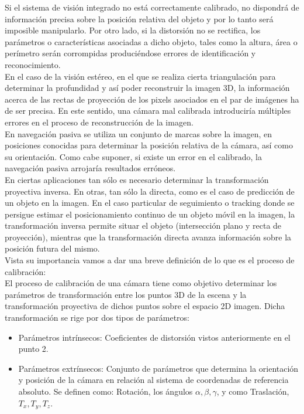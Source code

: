 \documentclass[a4,10pt]{article}
\begin{document}
\begin{enumerate}
Si el sistema de visión integrado no está correctamente calibrado, no dispondrá de información precisa sobre la posición relativa del objeto y por lo tanto será imposible manipularlo. Por otro lado, si la distorsión no se rectifica, los parámetros o características asociadas a dicho objeto, tales como la altura, área o perímetro serán corrompidas produciéndose errores de identificación y reconocimiento.\\
En el caso de la visión estéreo, en el que se realiza cierta triangulación para determinar la profundidad y así poder reconstruir la imagen 3D, la información acerca de las rectas de proyección de los pixels asociados en el par de imágenes ha de ser precisa. En este sentido, una cámara mal calibrada introduciría múltiples errores en el proceso de reconstrucción de la imagen.\\
En navegación pasiva se utiliza un conjunto de marcas sobre la imagen, en posiciones conocidas para determinar la posición relativa de la cámara, así como su orientación. Como cabe suponer, si existe un error en el calibrado, la navegación pasiva arrojaría resultados erróneos.\\
En ciertas aplicaciones tan sólo es necesario determinar la transformación proyectiva inversa. En otras, tan sólo la directa, como es el caso de predicción de un objeto en la imagen. En el caso particular de seguimiento o tracking donde se persigue estimar el posicionamiento continuo de un objeto móvil en la imagen, la transformación inversa permite situar el objeto (intersección plano y recta de proyección), mientras que la transformación directa avanza información sobre la posición futura del mismo.\\
Vista su importancia vamos a dar una breve definición de lo que es el proceso de calibración:\\
El proceso de calibración de una cámara tiene como objetivo determinar los parámetros de transformación entre los puntos 3D de la escena y la transformación proyectiva de dichos puntos sobre el espacio 2D imagen. Dicha transformación se rige por dos tipos de parámetros:
\begin {itemize}
\item Parámetros intrínsecos: Coeficientes de distorsión vistos anteriormente en el punto 2.
\item Parámetros extrínsecos: Conjunto de parámetros que determina la orientación y posición de la cámara en relación al sistema de coordenadas de referencia absoluto. Se definen como: Rotación, los ángulos $ \alpha ,\beta, \gamma$, y como Traslación, $ T_x, T_y, T_z $.

\end{itemize}
\end{enumerate}
\end{document}
